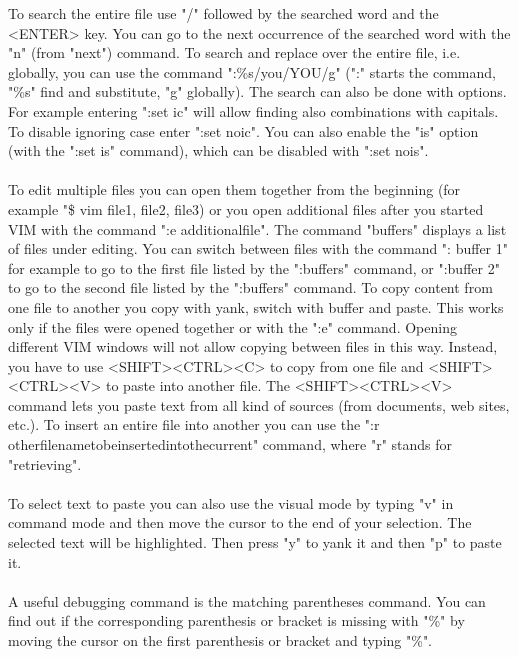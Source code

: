 \documentclass {article}
\begin{document}
To search the entire file use "/" followed by the searched word and the <ENTER> key. 
You can go to the next occurrence of the searched word with the "n" (from "next") command. 
To search and replace over the entire file, i.e. globally, you can use the command ":\%s/you/YOU/g" (":" starts the command, "\%s" find and substitute, "g" globally). 
The search can also be done with options. For example entering ":set ic" will allow finding also combinations with capitals. To disable ignoring case enter ":set noic".
 You can also enable the "is" option (with the ":set is" command), which can be disabled with ":set nois".
\\
\\
To edit multiple files you can open them together from the beginning (for example "\$ vim file1, file2, file3) or you open additional files after you started VIM with the command ":e additional\underline{\space}file".
 The command "buffers" displays a list of files under editing.
 You can switch between files with the command ": buffer 1" for example to go to the first file listed by the ":buffers" command, or ":buffer 2" to go to the second file listed by the ":buffers" command.
 To copy content from one file to another you copy with yank, switch with buffer and paste. 
This works only if the files were opened together or with the ":e" command. 
Opening different VIM windows will not allow copying between files in this way. Instead, you have to use <SHIFT><CTRL><C> to copy from one file and <SHIFT><CTRL><V> to paste into another file. The <SHIFT><CTRL><V> command lets you paste text from all kind of sources (from documents, web sites, etc.).
 To insert an entire file into another you can use the ":r other\underline{\space}file\underline{\space}name\underline{\space}to\underline{\space}be\underline{\space}inserted\underline{\space}into\underline{\space}the\underline{\space}current" command, where "r" stands for "retrieving".
\\ 
\\
To select text to paste you can also use the visual mode by typing "v" in command mode and then move the cursor to the end of your selection.
 The selected text will be highlighted. Then press "y" to yank it and then "p" to paste it.
\\
\\
A useful debugging command is the matching parentheses command. You can find out if the corresponding parenthesis or bracket is missing with "\%" by moving the cursor on the first parenthesis or bracket and typing "\%".    
\\
\end{document}

